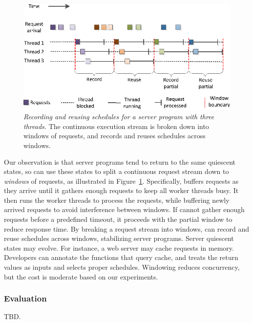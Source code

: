 \begin{figure}[t]
\includegraphics[width=\linewidth]{peregrine/figures/window-idea}
\vspace{-.3in}
\caption{{\em Recording and reusing schedules for a server program with
    three threads.}  The continuous execution stream is broken down into
  windows of requests, and \peregrine records and reuses schedules across
  windows.} \label{fig:window}
\end{figure}

Our observation is that server programs tend to return to the same
quiescent states, so \peregrine can use these states to split a continuous
request stream down to \emph{windows} of requests, as illustrated in
Figure~\ref{fig:window}.  Specifically, \peregrine buffers requests as they
arrive until it gathers enough requests to keep all worker threads busy.
It then runs the worker threads to process the requests, while buffering
newly arrived requests to avoid interference between windows.  If \peregrine
cannot gather enough requests before a predefined timeout, it proceeds
with the partial window to reduce response time.  By breaking a request
stream into windows, \peregrine can record and reuse schedules across
windows, stabilizing server programs.  
Server quiescent states may evolve.  For instance, a web server may cache
requests in memory.  Developers can annotate the functions that query
cache, and \peregrine treats the return values as inputs and selects proper
schedules.
Windowing reduces concurrency, but the cost is moderate based on our 
experiments.

\subsubsection{Evaluation} \label{sec:peregrine-eval}
TBD.


